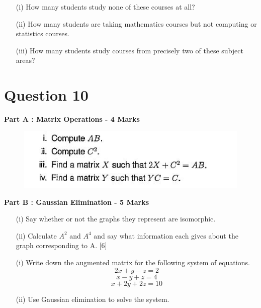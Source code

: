 \documentclass[12pt]{article} %
\begin{document}
\begin{itemize}
	\item[(i)] How many students study none of these courses at all?
	\item[(ii)] How many students are taking mathematics courses but not computing or statistics courses.
	\item[(iii)] How many students study courses from precisely two of these subject
	areas?
	
\end{itemize}
\newpage
\section*{Question 10}
\noindent \textbf{Part A : Matrix Operations - 4 Marks}\\ 
\begin{figure}[h!]
\centering
\includegraphics[width=1.11\linewidth]{MatrixQuestion2012}

\end{figure}


\noindent \textbf{Part B : Gaussian Elimination - 5 Marks}\\ 
\begin{itemize}
	\item[(i)] Say whether or not the graphs they represent are isomorphic.
	\item[(ii)] Calculate $A^2$ and $A^4$ and say what information each gives about the graph
	corresponding to A. [6]
\end{itemize}
	\begin{itemize}
		\item[(i)] Write down the augmented matrix for the following system of equations.
		\[2x + y - z = 2\]
		\[x - y + z = 4\]
		\[x + 2y + 2z = 10\]
		\item[(ii)] Use Gaussian elimination to solve the system. 
	\end{itemize}


\newpage
\end{document}
